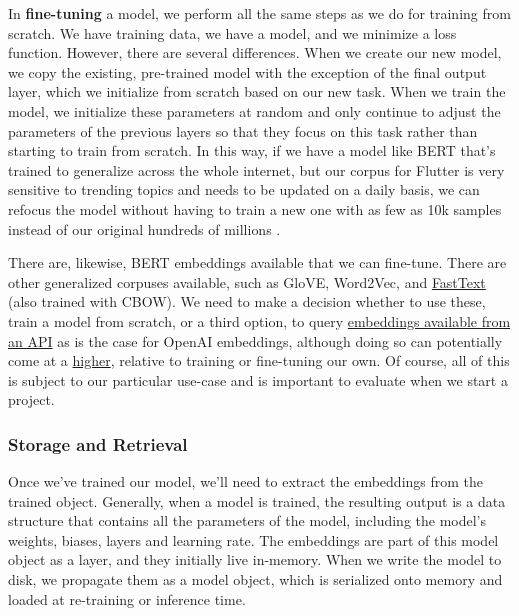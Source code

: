 \documentclass[11pt, table]{diazessay} %
\begin{document}
\begin{sloppypar}
In \textbf{fine-tuning} a model, we perform all the same steps as we do for training from scratch. We have training data, we have a model, and we minimize a loss function. However, there are several differences. When we create our new model, we copy the existing, pre-trained model with the exception of the final output layer, which we initialize from scratch based on our new task. When we train the model, we initialize these parameters at random and only continue to adjust the parameters of the previous layers so that they focus on this task rather than starting to train from scratch. In this way, if we have a model like BERT that's trained to generalize across the whole internet, but our corpus for Flutter is very sensitive to trending topics and needs to be updated on a daily basis, we can refocus the model without having to train a new one with as few as 10k samples instead of our original hundreds of millions \citep{zhang2020revisiting}.

There are, likewise, BERT embeddings available that we can fine-tune. There are other generalized corpuses available, such as GloVE, Word2Vec, and \href{https://fasttext.cc/docs/en/crawl-vectors.html}{FastText} (also trained with CBOW). We need to make a decision whether to use these, train a model from scratch, or a third option, to query \href{https://platform.openai.com/docs/guides/embeddings/limitations-risks}{embeddings available from an API} as is the case for OpenAI embeddings, although doing so can potentially come at a \href{https://github.com/ray-project/llm-numbers#101----cost-ratio-of-openai-embedding-to-self-hosted-embedding}{higher}, relative to training or fine-tuning our own. Of course, all of this is subject to our particular use-case and is important to evaluate when we start a project.

\subsubsection{Storage and Retrieval}

Once we've trained our model, we'll need to extract the embeddings from the trained object. Generally, when a model is trained, the resulting output is a data structure that contains all the parameters of the model, including the model's weights, biases, layers and learning rate. The embeddings are part of this model object as a layer, and they initially live in-memory. When we write the model to disk, we propagate them as a model object, which is serialized onto memory and loaded at re-training or inference time.


\end{sloppypar}
\end{document}
